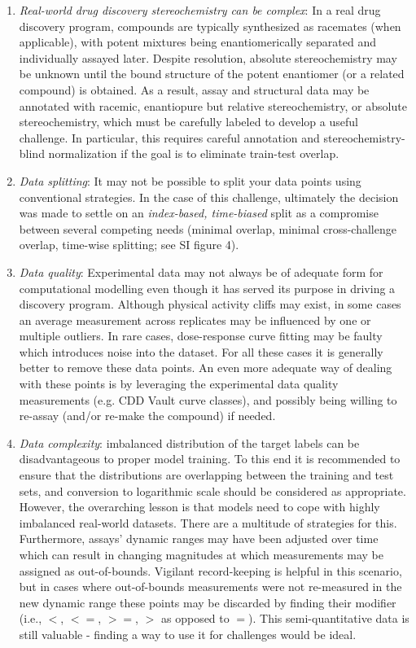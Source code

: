 \documentclass[journal=jcim,manuscript=article]{achemso}
\begin{document}
\begin{enumerate}
    \item \textit{Real-world drug discovery stereochemistry can be complex}: In a real drug discovery program, compounds are typically synthesized as racemates (when applicable), with potent mixtures being enantiomerically separated and individually assayed later. Despite resolution, absolute stereochemistry may be unknown until the bound structure of the potent enantiomer (or a related compound) is obtained. As a result, assay and structural data may be annotated with racemic, enantiopure but relative stereochemistry, or absolute stereochemistry, which must be carefully labeled to develop a useful challenge. In particular, this requires careful annotation and stereochemistry-blind normalization if the goal is to eliminate train-test overlap.
    \item \textit{Data splitting}: It may not be possible to split your data points using conventional strategies. In the case of this challenge, ultimately the decision was made to settle on an \textit{index-based, time-biased} split as a compromise between several competing needs (minimal overlap, minimal cross-challenge overlap, time-wise splitting; see SI figure 4). 
    \item \textit{Data quality}: Experimental data may not always be of adequate form for computational modelling even though it has served its purpose in driving a discovery program. Although physical activity cliffs may exist, in some cases an average measurement across replicates may be influenced by one or multiple outliers. In rare cases, dose-response curve fitting may be faulty which introduces noise into the dataset. For all these cases it is generally better to remove these data points. An even more adequate way of dealing with these points is by leveraging the experimental data quality measurements (e.g. CDD Vault curve classes), and possibly being willing to re-assay (and/or re-make the compound) if needed.
    \item \textit{Data complexity}: imbalanced distribution of the target labels can be disadvantageous to proper model training. To this end it is recommended to ensure that the distributions are overlapping between the training and test sets, and conversion to logarithmic scale should be considered as appropriate. However, the overarching lesson is that models need to cope with highly imbalanced real-world datasets. There are a multitude of strategies for this. Furthermore, assays' dynamic ranges may have been adjusted over time which can result in changing magnitudes at which measurements may be assigned as out-of-bounds. Vigilant record-keeping is helpful in this scenario, but in cases where out-of-bounds measurements were not re-measured in the new dynamic range these points may be discarded by finding their modifier (i.e., $<$, $<=$, $>=$, $>$ as opposed to $=$). This semi-quantitative data is still valuable - finding a way to use it for challenges would be ideal.
\end{enumerate}
\end{document}
